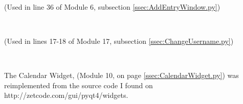 \

\begin{tiny}
\end{tiny}
(Used in line 36 of Module 6, subsection \ref{ssec:AddEntryWindow.py})

\

\begin{tiny}
\end{tiny}
(Used in lines 17-18 of Module 17, subsection \ref{ssec:ChangeUsername.py})

\

The Calendar Widget, (Module 10, on page \ref{ssec:CalendarWidget.py}) was reimplemented from the source code I found on http://zetcode.com/gui/pyqt4/widgets.
\begin{tiny}
\end{tiny}

